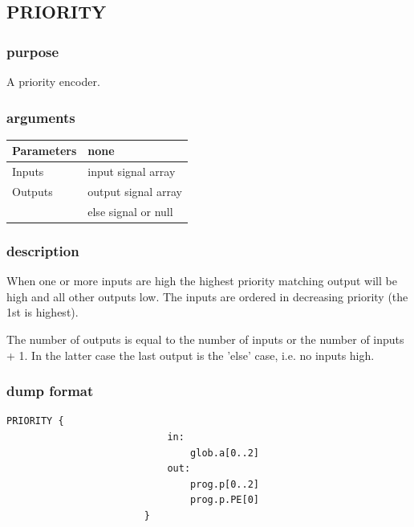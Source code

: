 \documentclass[10pt,a4paper,twoside,fleqn]{book}
\begin{document}
            \subsection{PRIORITY}

                \subsubsection{purpose}

                    A priority encoder.

                \subsubsection{arguments}

                    \begin{tabular}{| l | l |}
                    \hline
                    Parameters  & none \\
                    \hline
                    Inputs      & input signal array \\
                    \hline
                    Outputs     & output signal array \\
                                & else signal or null \\
                    \hline
                    \end{tabular}

                \subsubsection{description}

                When one or more inputs are high the highest priority matching
                output will be high and all other outputs low. The inputs are
                ordered in decreasing priority (the 1st is highest).

                The number of outputs is equal to the number of inputs or the
                number of inputs + 1. In the latter case the last output is
                the 'else' case, i.e. no inputs high.

                \subsubsection{dump format}

                    \begin{lstlisting}[gobble=20, language=tde]
                        PRIORITY {
                            in:
                                glob.a[0..2]
                            out:
                                prog.p[0..2]
                                prog.p.PE[0]
                        }
                    \end{lstlisting}
\end{document}
